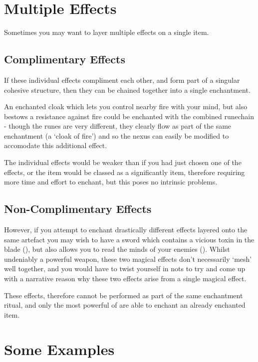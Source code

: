 \section{Multiple Effects}

Sometimes you may want to layer multiple effects on a single item. 

\subsection{Complimentary Effects} 

If these individual effects compliment each other, and form part of a singular cohesive structure, then they can be chained together into a single enchantment. 

An enchanted cloak which lets you control nearby fire with your mind, but also bestows a resistance against fire could be enchanted with the combined runechain \rune{\mentis\velox\primum\iuxta\aeternum\clypus} - though the runes are very different, they clearly flow as part of the same enchantment (a `cloak of fire') and so the nexus can easily be modified to accomodate this additional effect. 

The individual effects would be weaker than if you had just chosen one of the effects, or the item would be classed as a significantly  item, therefore requiring more time and effort to enchant, but this poses no intrinsic problems. 

\subsection{Non-Complimentary Effects}

However, if you attempt to enchant drastically different effects layered onto the same artefact \minus{} you may wish to have a sword which contains a vicious toxin in the blade (\rune{\sessio\displos\morbus}), but also allows you to read the minds of your enemies (\rune{\mentis\velox\animus}). Whilst undeniably a powerful weapon, these two magical effects don't necessarily `mesh' well together, and you would have to twist yourself in nots to try and come up with a narrative reason why these two effects arise from a single magical effect. 

These effects, therefore cannot be performed as part of the same enchantment ritual, and only the most powerful of  are able to enchant an already enchanted item. 


\section{Some Examples}\label{E:EnchantingExamples}

